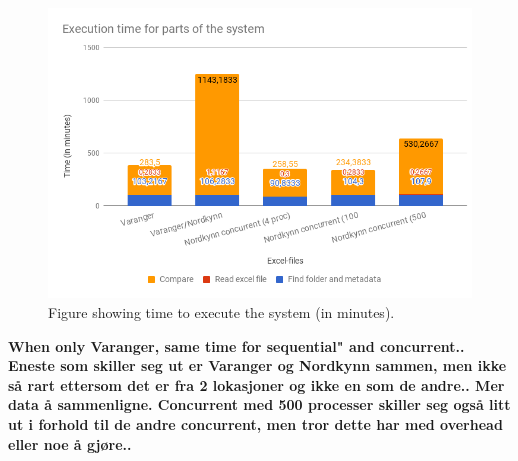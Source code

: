 \documentclass[USenglish]{uit-thesis}
\begin{document}

\begin{figure}
\centering
\includegraphics[width=\textwidth]{chart500proc_new.png}
\caption{Figure showing time to execute the system (in minutes).}
\label{fig:time_chart500}
\end{figure}

\textbf{When only Varanger, same time for sequential" and concurrent.. Eneste som skiller seg ut er Varanger og Nordkynn sammen, men ikke så rart ettersom det er fra 2 lokasjoner og ikke en som de andre.. Mer data å sammenligne. Concurrent med 500 processer skiller seg også litt ut i forhold til de andre concurrent, men tror dette har med overhead eller noe å gjøre..}
\end{document}
